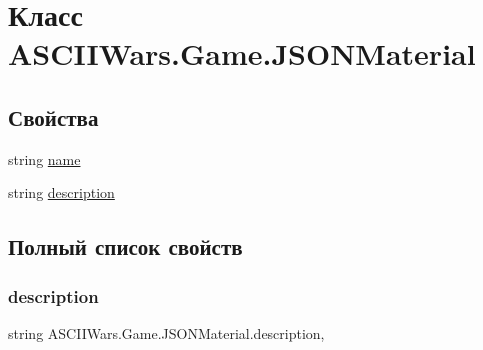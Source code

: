 \hypertarget{class_a_s_c_i_i_wars_1_1_game_1_1_j_s_o_n_material}{}\section{Класс A\+S\+C\+I\+I\+Wars.\+Game.\+J\+S\+O\+N\+Material}
\label{class_a_s_c_i_i_wars_1_1_game_1_1_j_s_o_n_material}
\subsection*{Свойства}
\begin{DoxyCompactItemize}
\item 
string \hyperlink{class_a_s_c_i_i_wars_1_1_game_1_1_j_s_o_n_material_a9df052f6f8c7941082da4ccd44d29455}{name}
\item 
string \hyperlink{class_a_s_c_i_i_wars_1_1_game_1_1_j_s_o_n_material_a099d5775950c583e3c660d69348590f2}{description}
\end{DoxyCompactItemize}


\subsection{Полный список свойств}
\hypertarget{class_a_s_c_i_i_wars_1_1_game_1_1_j_s_o_n_material_a099d5775950c583e3c660d69348590f2}{}\label{class_a_s_c_i_i_wars_1_1_game_1_1_j_s_o_n_material_a099d5775950c583e3c660d69348590f2} 
\subsubsection{\texorpdfstring{description}{description}}
{\footnotesize\ttfamily string A\+S\+C\+I\+I\+Wars.\+Game.\+J\+S\+O\+N\+Material.\+description\hspace{0.3cm}{\ttfamily [get]}, {\ttfamily [set]}}

\hypertarget{class_a_s_c_i_i_wars_1_1_game_1_1_j_s_o_n_material_a9df052f6f8c7941082da4ccd44d29455}{}\label{class_a_s_c_i_i_wars_1_1_game_1_1_j_s_o_n_material_a9df052f6f8c7941082da4ccd44d29455} 
